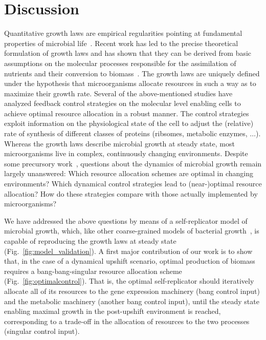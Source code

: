 \section{Discussion}
\label{sec:discussion}

Quantitative growth laws are empirical regularities pointing at fundamental properties of microbial life~\cite{scott_bacterial_2011}.
Recent work has led to the precise theoretical formulation of growth laws and has shown that they can be derived from basic assumptions on the molecular processes responsible for the assimilation of nutrients and their conversion to biomass~\cite{bosdriesz_how_2015,maitra_bacterial_2014,molenaar_shifts_2009,scott_emergence_2014,weisse_mechanistic_2015}.
The growth laws are uniquely defined under the hypothesis that microorganisms allocate resources in such a way as to maximize their growth rate.
Several of the above-mentioned studies have analyzed feedback control strategies on the molecular level enabling cells to achieve optimal resource allocation in a robust manner.
The control strategies exploit information on the physiological state of the cell to adjust the (relative) rate of synthesis of different classes of proteins (ribsomes, metabolic enzymes, $\ldots$).
Whereas the growth laws describe microbial growth at steady state, most microorganisms live in complex, continuously changing environments.
Despite some precursory work~\cite{pavlov_optimal_2013,vandenberg_optimal_1998}, questions about the dynamics of microbial growth remain largely unanswered:
Which resource allocation schemes are optimal in changing environments? Which dynamical control strategies lead to (near-)optimal resource allocation? How do these strategies compare with those actually implemented by microorganisms? 

We have addressed the above questions by means of a self-replicator model of microbial growth, which, like other coarse-grained models of bacterial growth~\cite{maitra_bacterial_2014,molenaar_shifts_2009,scott_emergence_2014}, is capable of reproducing the growth laws at steady state (Fig.~\ref{fig:model_validation}).
A first major contribution of our work is to show that, in the case of a dynamical upshift scenario, optimal production of biomass requires a bang-bang-singular resource allocation scheme (Fig.~\ref{fig:optimalcontrol}).
That is, the optimal self-replicator should iteratively allocate all of its resources to the gene expression machinery (bang control input) and the metabolic machinery (another bang control input), until the steady state enabling maximal growth in the post-upshift environment is reached, corresponding to a trade-off in the allocation of resources to the two processes (singular control input).

